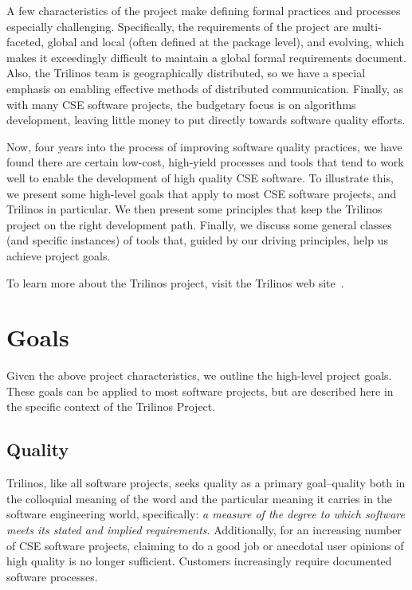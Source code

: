 \documentclass{doublecol}
\begin{document}
A few characteristics of the project make defining formal practices
and processes especially challenging.  Specifically, the
requirements of the project are multi-faceted, global and local
(often defined at the package level), and evolving, which makes it
exceedingly difficult to maintain a global formal requirements
document. Also, the Trilinos team is geographically distributed, so
we have a special emphasis on enabling effective methods of
distributed communication. Finally, as with many CSE software
projects, the budgetary focus is on algorithms development, leaving
little money to put directly towards software quality efforts.

Now, four years into the process of improving software quality
practices, we have found there are certain low-cost, high-yield
processes and tools that tend to work well to enable the development
of high quality CSE software.  To illustrate this, we present some
high-level goals that apply to most CSE software projects, and
Trilinos in particular.  We then present some principles that keep
the Trilinos project on the right development path.  Finally, we
discuss some general classes (and specific instances) of tools that,
guided by our driving principles, help us achieve project goals.

To learn more about the Trilinos project, visit the Trilinos web
site~\cite{Trilinos-home-page}.


\section{Goals}
\label{Section:Goals}

Given the above project characteristics, we outline the high-level
project goals. These goals can be applied to most software projects,
but are described here in the specific context of the Trilinos
Project.

\subsection{Quality}
Trilinos, like all software projects, seeks quality as a primary
goal--quality both in the colloquial meaning of the word and the
particular meaning it carries in the software engineering world,
specifically:  \emph{a measure of the degree to which software meets
its stated and implied requirements}.  Additionally, for an
increasing number of CSE software projects, claiming to do a good
job or anecdotal user opinions of high quality is no longer
sufficient. Customers increasingly require documented software
processes.
\end{document}
